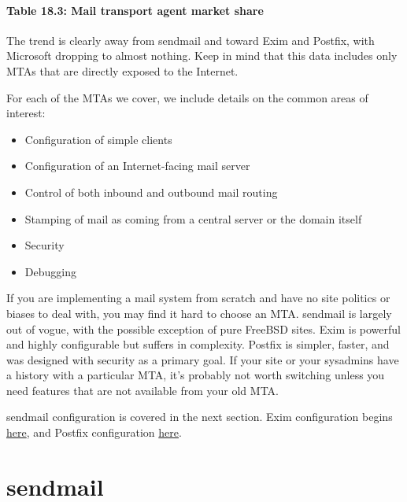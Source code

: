 \paragraph[{Table 18.3: }Mail transport agent market
share]{\texorpdfstring{{Table 18.3:
}\protect\hypertarget{part0026_split_023.htmlux5cux23_idTextAnchor1041}{}{}\protect\hypertarget{part0026_split_023.htmlux5cux23_idTextAnchor1042}{}{}Mail
transport agent market
share}{Table 18.3: Mail transport agent market share}}


\protect\hypertarget{part0026_split_023.htmlux5cux23_idIndexMarker2492}{}{}The
trend is clearly away from {sendmail} and toward Exim and Postfix, with
Microsoft dropping to almost nothing. Keep in mind that this data
includes only MTAs that are directly exposed to the Internet.

For each of the MTAs we cover, we include details on the common areas of
interest:

\begin{itemize}
\tightlist
\item
  Configuration of simple clients
\item
  Configuration of an Internet-facing mail server
\item
  Control of both inbound and outbound mail routing
\item
  Stamping of mail as coming from a central server or the domain itself
\item
  Security
\item
  Debugging
\end{itemize}

If you are implementing a mail system from scratch and have no site
politics or biases to deal with, you may find it hard to choose an MTA.
{sendmail} is largely out of vogue, with the possible exception of pure
FreeBSD sites. Exim is powerful and highly configurable but suffers in
complexity. Postfix is simpler, faster, and was designed with security
as a primary goal. If your site or your sysadmins have a history with a
particular MTA, it's probably not worth switching unless you need
features that are not available from your old MTA.

{sendmail} configuration is covered in the next section. Exim
configuration begins
\protect\hyperlink{part0026_split_040.htmlux5cux23_idTextAnchor1125}{here},
and Postfix configuration
\protect\hyperlink{part0026_split_057.htmlux5cux23_idTextAnchor1163}{here}.


\section{sendmail}

